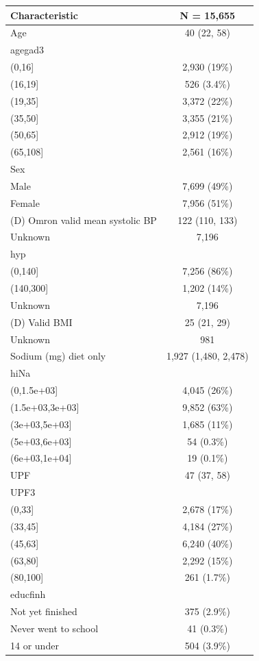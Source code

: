 \documentclass[
]{article}
\begin{document}
\begin{longtable}[]{@{}lc@{}}
\toprule()
\textbf{Characteristic} & \textbf{N = 15,655} \\
\midrule()
\endhead
Age & 40 (22, 58) \\
agegad3 & \\
(0,16{]} & 2,930 (19\%) \\
(16,19{]} & 526 (3.4\%) \\
(19,35{]} & 3,372 (22\%) \\
(35,50{]} & 3,355 (21\%) \\
(50,65{]} & 2,912 (19\%) \\
(65,108{]} & 2,561 (16\%) \\
Sex & \\
Male & 7,699 (49\%) \\
Female & 7,956 (51\%) \\
(D) Omron valid mean systolic BP & 122 (110, 133) \\
Unknown & 7,196 \\
hyp & \\
(0,140{]} & 7,256 (86\%) \\
(140,300{]} & 1,202 (14\%) \\
Unknown & 7,196 \\
(D) Valid BMI & 25 (21, 29) \\
Unknown & 981 \\
Sodium (mg) diet only & 1,927 (1,480, 2,478) \\
hiNa & \\
(0,1.5e+03{]} & 4,045 (26\%) \\
(1.5e+03,3e+03{]} & 9,852 (63\%) \\
(3e+03,5e+03{]} & 1,685 (11\%) \\
(5e+03,6e+03{]} & 54 (0.3\%) \\
(6e+03,1e+04{]} & 19 (0.1\%) \\
UPF & 47 (37, 58) \\
UPF3 & \\
(0,33{]} & 2,678 (17\%) \\
(33,45{]} & 4,184 (27\%) \\
(45,63{]} & 6,240 (40\%) \\
(63,80{]} & 2,292 (15\%) \\
(80,100{]} & 261 (1.7\%) \\
educfinh & \\
Not yet finished & 375 (2.9\%) \\
Never went to school & 41 (0.3\%) \\
14 or under & 504 (3.9\%) \\

\end{longtable}
\end{document}
